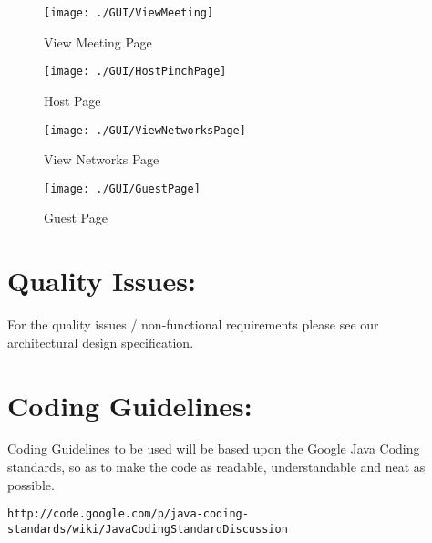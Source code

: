 \documentclass[12pt]{article}
\begin{document}
\begin{figure}[htbp]
\centering
\texttt{[image: ./GUI/ViewMeeting]}
\caption{View Meeting Page}
\label{fig:ViewMeeting}
\end{figure}
\newpage

\begin{figure}[htbp]
\centering
\texttt{[image: ./GUI/HostPinchPage]}
\caption{Host Page}
\label{fig:HostPage}
\end{figure}
\newpage

\begin{figure}[htbp]
\centering
\texttt{[image: ./GUI/ViewNetworksPage]}
\caption{View Networks Page}
\label{fig:ViewNetworksPage}
\end{figure}
\newpage

\begin{figure}[htbp]
\centering
\texttt{[image: ./GUI/GuestPage]}
\caption{Guest Page}
\label{fig:GuestPage}
\end{figure}
\newpage


\section{Quality Issues:}
For the quality issues / non-functional requirements please see our\\ architectural design specification.

\section{Coding Guidelines:}
Coding Guidelines to be used will be based upon the Google Java Coding standards, so as to make the code as readable, understandable and neat as possible.
\begin{verbatim}
http://code.google.com/p/java-coding-standards/wiki/JavaCodingStandardDiscussion
\end{verbatim}
\end{document}
